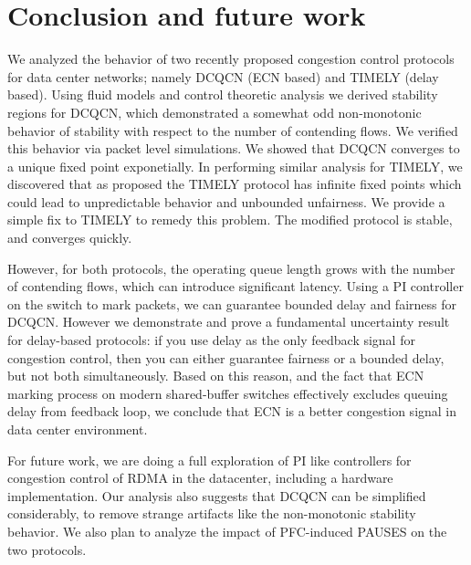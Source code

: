 \vspace{-0.5em}
\section{Conclusion and future work}
We analyzed  the behavior of two recently proposed congestion control protocols
for data center networks; namely DCQCN (ECN based) and TIMELY (delay based).
Using fluid models and control theoretic analysis we derived stability regions
for DCQCN, which demonstrated a somewhat odd non-monotonic behavior of stability
with respect to the number of contending flows. We verified this behavior via
packet level simulations. We showed that DCQCN converges to a unique
fixed point exponetially. In performing similar analysis for TIMELY, we discovered that as proposed
the TIMELY protocol has infinite fixed points which could lead to unpredictable
behavior and unbounded unfairness. We provide a simple fix to TIMELY to remedy
this problem. The modified protocol is stable, and converges quickly.

However, for both protocols, the operating queue length grows with the number of
contending flows, which can introduce significant latency. Using a PI controller
on the switch to mark packets, we can guarantee bounded delay and fairness for
DCQCN.  However we demonstrate and prove a fundamental uncertainty result for
delay-based protocols: if you use delay as the only feedback signal for
congestion control, then you can either guarantee fairness or a bounded delay,
but not both simultaneously. Based on this reason, and the fact that ECN marking
process on modern shared-buffer switches effectively excludes queuing delay from
feedback loop, we conclude that ECN is a better congestion signal in data center
environment. 

For future work, we are doing a full exploration of PI like controllers for
congestion control of RDMA in the datacenter, including a hardware
implementation. Our analysis also suggests that DCQCN can be simplified
considerably, to remove strange artifacts like the non-monotonic stability
behavior. We also plan to analyze the impact of PFC-induced PAUSES on the two
protocols.


